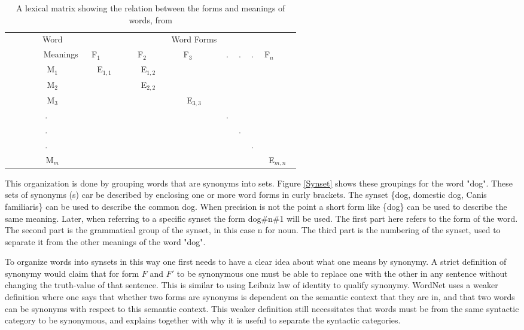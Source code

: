 \begin{table}[ht]
	\centering
	\begin{tabular}{|c||ccccccc|}
		\hline
	        Word     & 	~		 & ~		 & Word Forms & ~ & ~ & ~ & ~		  \\
	        Meanings & F$_1$     & F$_2$     & F$_3$      & . & . & . & F$_n$     \\ \hline
	        M$_1$    & E$_{1,1}$ & E$_{1,2}$ & ~          & ~ & ~ & ~ & ~         \\
	        M$_2$    & ~         & E$_{2,2}$ & ~          & ~ & ~ & ~ & ~         \\
	        M$_3$    & ~         & ~         & E$_{3,3}$  & ~ & ~ & ~ & ~         \\
	        .        & ~         & ~         & ~          & . & ~ & ~ & ~         \\
	        .        & ~         & ~         & ~          & ~ & . & ~ & ~         \\
	        .        & ~         & ~         & ~          & ~ & ~ & . & ~         \\
	        M$_m$    & ~         & ~         & ~          & ~ & ~ & ~ & E$_{m,n}$ \\
		\hline
	\end{tabular}
	\caption{A lexical matrix showing the relation between the forms and meanings of words, from \citet{Miller1990}}
	\label{table:LexicalMatrix}
\end{table}

This organization is done by grouping words that are synonyms into sets.
Figure \ref{Synset} shows these groupings for the word "dog".
These sets of synonyms (s)
car be described by enclosing one or more word forms in curly brackets.
The synset \{dog, domestic dog, Canis familiaris\} can be used to describe the common dog.
When precision is not the point a short form like \{dog\} can be used to describe the same meaning.
Later, when referring to a specific synset the form dog\#n\#1 will be used.
The first part here refers to the form of the word.
The second part is the grammatical group of the synset, in this case n for noun.
The third part is the numbering of the synset, used to separate it from the other meanings of the word "dog".


To organize words into synsets in this way one first needs to have a clear idea about what one means by synonymy.
A strict definition of synonymy would claim that for form $F$ and $F'$ to be synonymous one must be able
to replace one with the other in any sentence without changing the truth-value of that sentence.
This is similar to using Leibniz law of identity to qualify synonymy.
WordNet uses a weaker definition where one says that whether two forms are synonyms is dependent on the
semantic context that they are in, and that two words can be synonyms with respect to this semantic context\citep{Miller1990}.
This weaker definition still necessitates that words must be from the same syntactic category to be synonymous,
and explains together with \citet{Fillenbaum1965} why it is useful to separate the syntactic categories.

